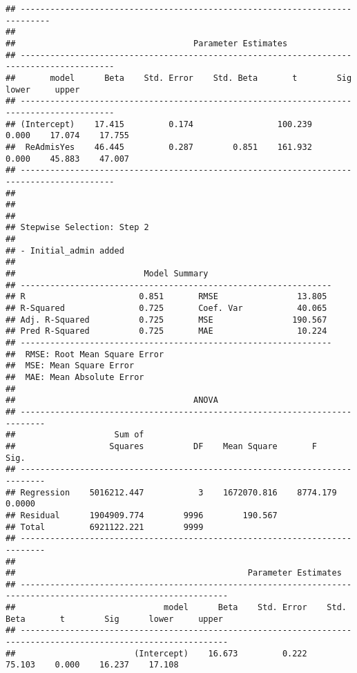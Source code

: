 \documentclass[
]{article}
\begin{document}
\begin{verbatim}
## ----------------------------------------------------------------------------
## 
##                                    Parameter Estimates                                    
## -----------------------------------------------------------------------------------------
##       model      Beta    Std. Error    Std. Beta       t        Sig      lower     upper 
## -----------------------------------------------------------------------------------------
## (Intercept)    17.415         0.174                 100.239    0.000    17.074    17.755 
##  ReAdmisYes    46.445         0.287        0.851    161.932    0.000    45.883    47.007 
## -----------------------------------------------------------------------------------------
## 
## 
## 
## Stepwise Selection: Step 2 
## 
## - Initial_admin added 
## 
##                          Model Summary                          
## ---------------------------------------------------------------
## R                       0.851       RMSE                13.805 
## R-Squared               0.725       Coef. Var           40.065 
## Adj. R-Squared          0.725       MSE                190.567 
## Pred R-Squared          0.725       MAE                 10.224 
## ---------------------------------------------------------------
##  RMSE: Root Mean Square Error 
##  MSE: Mean Square Error 
##  MAE: Mean Absolute Error 
## 
##                                    ANOVA                                    
## ---------------------------------------------------------------------------
##                    Sum of                                                  
##                   Squares          DF    Mean Square       F          Sig. 
## ---------------------------------------------------------------------------
## Regression    5016212.447           3    1672070.816    8774.179    0.0000 
## Residual      1904909.774        9996        190.567                       
## Total         6921122.221        9999                                      
## ---------------------------------------------------------------------------
## 
##                                               Parameter Estimates                                                
## ----------------------------------------------------------------------------------------------------------------
##                              model      Beta    Std. Error    Std. Beta       t        Sig      lower     upper 
## ----------------------------------------------------------------------------------------------------------------
##                        (Intercept)    16.673         0.222                  75.103    0.000    16.237    17.108 

\end{verbatim}
\end{document}

